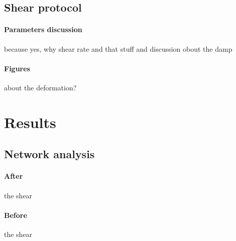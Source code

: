\subsection{Shear protocol}

\paragraph{Parameters discussion} because yes, why shear rate and that stuff and discussion obout the damp

\paragraph{Figures} about the deformation?

\section{Results}\label{ch3:Results}

\subsection{Network analysis}

\paragraph{After} the shear

\paragraph{Before} the shear

\newpage
